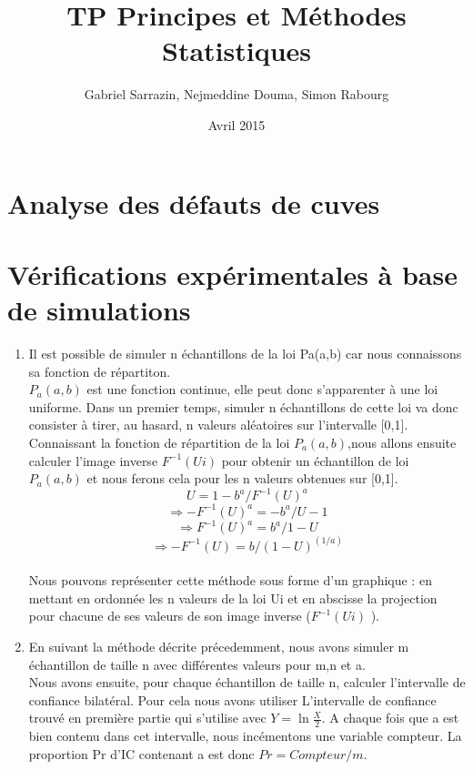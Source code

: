 \documentclass[12pt]{article}
\title{TP Principes et M\'{e}thodes Statistiques}
\author{Gabriel Sarrazin, Nejmeddine Douma, Simon Rabourg}
\date{Avril 2015}
\newcommand{\dsp}{\displaystyle}
\begin{document}

\maketitle

\section{Analyse des d\'{e}fauts de cuves}


\section{V\'{e}rifications exp\'{e}rimentales \`{a} base de simulations}


\begin{enumerate}
\item Il est possible de simuler n \'{e}chantillons de la loi Pa(a,b) car nous connaissons sa fonction de r\'{e}partiton. 
\\
$P_a(a,b)$ est une fonction continue, elle peut donc s'apparenter \`{a} une loi uniforme.  Dans un premier temps, simuler n \'{e}chantillons de cette loi va donc consister  \`{a} tirer, au hasard, n valeurs al\'{e}atoires sur l'intervalle [0,1]. Connaissant la fonction de r\'{e}partition de la loi  $P_a(a,b)$,nous allons ensuite calculer l'image inverse $ F^{-1}(Ui)$  pour obtenir un \'{e}chantillon de loi $P_a(a,b)$ et nous ferons cela pour les n valeurs obtenues sur [0,1].
\\
$$ U = 1 - b^a/ F^{-1}(U)^a$$
$$ \Longrightarrow -F^{-1}(U)^a = -b^a/ U-1$$
$$ \Longrightarrow F^{-1}(U)^a = b^a/ 1-U$$
$$  \Longrightarrow-F^{-1}(U) = b/ (1-U)^{(1/a)}$$
\\
Nous pouvons repr\'{e}senter cette m\'{e}thode sous forme d'un graphique : en mettant en ordonn\'{e}e les n valeurs de la loi Ui et en abscisse la projection pour chacune de ses valeurs de son image inverse ($F^{-1}(Ui)$ ).
\\

\item
 En suivant la m\'{e}thode d\'{e}crite pr\'{e}cedemment, nous  avons simuler m \'{e}chantillon de taille n avec diff\'{e}rentes valeurs pour m,n et a. 
\\
Nous avons ensuite, pour chaque \'{e}chantillon de taille n, calculer l'intervalle de confiance bilat\'{e}ral. Pour cela nous avons utiliser L'intervalle de confiance trouv\'{e} en premi\`{e}re partie qui s'utilise avec $Y=\ln {\dsp \frac{X}{2}}$.  A chaque fois que a est bien contenu dans cet intervalle, nous inc\'{e}mentons une variable compteur. La proportion Pr d'IC contenant a est donc $Pr = Compteur/m$.
\\


\end{enumerate}
\end{document}
